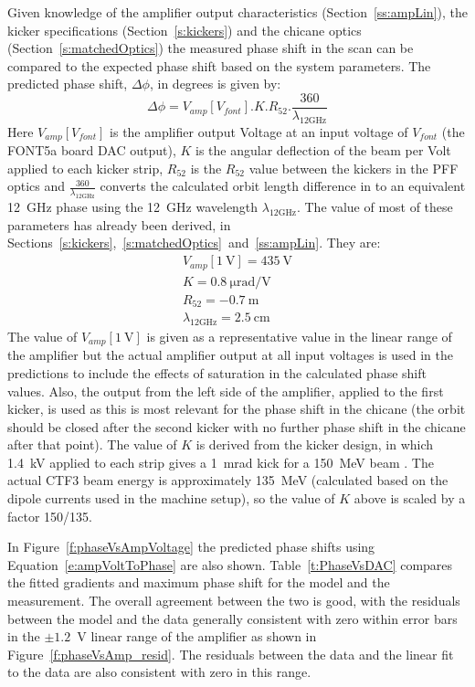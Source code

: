 Given knowledge of the amplifier output characteristics (Section~\ref{ss:ampLin}), the kicker specifications (Section~\ref{s:kickers}) and the chicane optics (Section~\ref{s:matchedOptics}) the measured phase shift in the scan can be compared to the expected phase shift based on the system parameters. The predicted phase shift, \(\Delta\phi\), in degrees is given by:
\begin{equation}
 	\Delta\phi = V_{amp}[V_{font}].K.R_{52}.\frac{360}{\lambda_{12\mathrm{GHz}}}
 	\label{e:ampVoltToPhase}
\end{equation} 
Here \(V_{amp}[V_{font}]\) is the amplifier output Voltage at an input voltage of \(V_{font}\) (the FONT5a board DAC output), \(K\) is the angular deflection of the beam per Volt applied to each kicker strip, \(R_{52}\) is the \(R_{52}\) value between the kickers in the PFF optics and \(\frac{360}{\lambda_{12\mathrm{GHz}}}\) converts the calculated orbit length difference in to an equivalent 12~GHz phase using the 12~GHz wavelength \(\lambda_{12\mathrm{GHz}}\). The value of most of these parameters has already been derived, in Sections~\ref{s:kickers},~\ref{s:matchedOptics}~and~\ref{ss:ampLin}. They are:
\begin{eqnarray*}
V_{amp}[1~\mathrm{V}] = 435~\mathrm{V} \\
K = 0.8~\mathrm{\mu rad/V}\\
R_{52} = -0.7~\mathrm{m}\\
\lambda_{12\mathrm{GHz}} = 2.5~\mathrm{cm} 
\end{eqnarray*}
The value of \(V_{amp}[1~\mathrm{V}]\) is given as a representative value in the linear range of the amplifier but the actual amplifier output at all input voltages is used in the predictions to include the effects of saturation in the calculated phase shift values. Also, the output from the left side of the amplifier, applied to the first kicker, is used as this is most relevant for the phase shift in the chicane (the orbit should be closed after the second kicker with no further phase shift in the chicane after that point). The value of \(K\) is derived from the kicker design, in which 1.4~kV applied to each strip gives a 1~mrad kick for a 150~MeV beam \cite{kickerIPAC11}.  The actual CTF3 beam energy is approximately 135~MeV (calculated based on the dipole currents used in the machine setup), so the value of \(K\) above is scaled by a factor 150/135.

In Figure~\ref{f:phaseVsAmpVoltage} the predicted phase shifts using Equation~\ref{e:ampVoltToPhase} are also shown. Table~\ref{t:PhaseVsDAC} compares the fitted gradients and maximum phase shift for the model and the measurement. The overall agreement between the two is good, with the residuals between the model and the data generally consistent with zero within error bars in the \(\pm1.2\)~V linear range of the amplifier as shown in Figure~\ref{f:phaseVsAmp_resid}. The residuals between the data and the linear 
fit to the data are also consistent with zero in this range.

